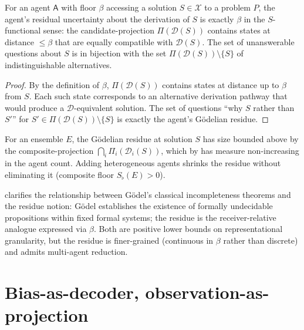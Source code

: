 \documentclass[11pt,a4paper]{article}
\newcommand{\D}{\mathcal{D}}
\newcommand{\X}{\mathcal{X}}
\newcommand{\agent}{\mathsf{A}}
\newcommand{\Sfloor}{S_{\flat}}
\begin{document}
\begin{theorem}\label{thm:resid-floor}
For an agent $\agent$ with floor $\beta$ accessing a solution
$S\in\X$ to a problem $P$, the agent's residual uncertainty about
the derivation of $S$ is exactly $\beta$ in the $S$-functional sense:
the candidate-projection $\Pi(\D(S))$ contains states at distance
$\le\beta$ that are equally compatible with $\D(S)$. The set of
unanswerable questions about $S$ is in bijection with the set
$\Pi(\D(S))\setminus\{S\}$ of indistinguishable alternatives.
\end{theorem}

\begin{proof}
By the definition of $\beta$, $\Pi(\D(S))$ contains states at distance
up to $\beta$ from $S$. Each such state corresponds to an alternative
derivation pathway that would produce a $\D$-equivalent solution. The
set of questions ``why $S$ rather than $S'$'' for $S'\in\Pi(\D(S))
\setminus\{S\}$ is exactly the agent's Gödelian residue.
\end{proof}

\begin{corollary}\label{cor:resid-ens}
For an ensemble $E$, the Gödelian residue at solution $S$ has size
bounded above by the composite-projection
$\bigcap_i\Pi_i(\D_i(S))$, which by  has measure
non-increasing in the agent count. Adding heterogeneous agents
shrinks the residue without eliminating it (composite floor
$\Sfloor(E)>0$).
\end{corollary}

\begin{remark}\label{rem:godel-vs-residue}
 clarifies the relationship between Gödel's
classical incompleteness theorems and the residue notion: Gödel
establishes the existence of formally undecidable propositions within
fixed formal systems; the residue is the receiver-relative analogue
expressed via $\beta$. Both are positive lower bounds on
representational granularity, but the residue is finer-grained
(continuous in $\beta$ rather than discrete) and admits multi-agent
reduction.
\end{remark}

\section{Bias-as-decoder, observation-as-projection}
\label{sec:bias}
\end{document}

